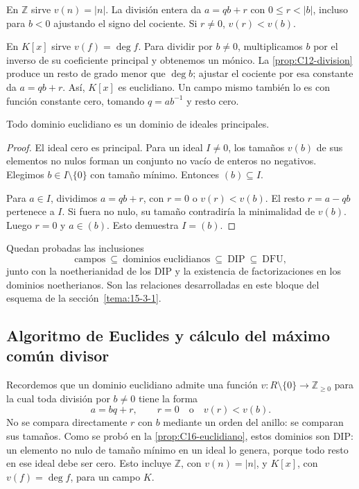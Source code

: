 \begin{ejem}
En $\mathbb Z$ sirve $v(n)=|n|$. La división entera da $a=qb+r$ con $0\leq r<|b|$, incluso para $b<0$ ajustando el signo del cociente. Si $r\ne0$, $v(r)<v(b)$.

En $K[x]$ sirve $v(f)=\deg f$. Para dividir por $b\ne0$, multiplicamos $b$ por el inverso de su coeficiente principal y obtenemos un mónico. La \cref{prop:C12-division} produce un resto de grado menor que $\deg b$; ajustar el cociente por esa constante da $a=qb+r$. Así, $K[x]$ es euclidiano. Un campo mismo también lo es con función constante cero, tomando $q=ab^{-1}$ y resto cero.
\end{ejem}

\begin{prop}\label{prop:C16-euclidiano}
Todo dominio euclidiano es un dominio de ideales principales.
\end{prop}
\begin{proof}
El ideal cero es principal. Para un ideal $I\ne0$, los tamaños $v(b)$ de sus elementos no nulos forman un conjunto no vacío de enteros no negativos. Elegimos $b\in I\setminus\{0\}$ con tamaño mínimo. Entonces $(b)\subseteq I$.

Para $a\in I$, dividimos $a=qb+r$, con $r=0$ o $v(r)<v(b)$. El resto $r=a-qb$ pertenece a $I$. Si fuera no nulo, su tamaño contradiría la minimalidad de $v(b)$. Luego $r=0$ y $a\in(b)$. Esto demuestra $I=(b)$.
\end{proof}
Quedan probadas las inclusiones
\[
\text{campos}\ \subseteq\ \text{dominios euclidianos}
\ \subseteq\ \text{DIP}\ \subseteq\ \text{DFU},
\]
junto con la noetherianidad de los DIP y la existencia de factorizaciones en los dominios noetherianos. Son las relaciones desarrolladas en este bloque del esquema de la sección~\ref{tema:15-3-1}.

\subsection{Algoritmo de Euclides y cálculo del máximo común divisor}\label{tema:17-1-1}\label{tema:17-1-2}
Recordemos que un dominio euclidiano admite una función $v:R\setminus\{0\}\to\mathbb Z_{\geq0}$ para la cual toda división por $b\ne0$ tiene la forma
\[
a=bq+r,\qquad r=0\quad\text{o}\quad v(r)<v(b).
\]
No se compara directamente $r$ con $b$ mediante un orden del anillo: se comparan sus tamaños. Como se probó en la \cref{prop:C16-euclidiano}, estos dominios son DIP: un elemento no nulo de tamaño mínimo en un ideal lo genera, porque todo resto en ese ideal debe ser cero. Esto incluye $\mathbb Z$, con $v(n)=|n|$, y $K[x]$, con $v(f)=\deg f$, para un campo $K$.

